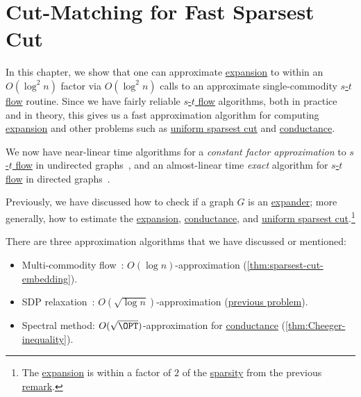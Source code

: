 \chapter{Cut-Matching for Fast Sparsest Cut}
In this chapter, we show that one can approximate \hyperref[def:expansion]{expansion} to within an \(O(\log ^2 n)\) factor via \(O(\log ^2 n)\) calls to an approximate single-commodity \hyperref[prb:s-t-max-flow]{\(s\)-\(t\) flow} routine. Since we have fairly reliable \hyperref[prb:s-t-max-flow]{\(s\)-\(t\) flow} algorithms, both in practice and in theory, this gives us a fast approximation algorithm for computing \hyperref[def:expansion]{expansion} and other problems such as \hyperref[prb:sparsest-cut]{uniform sparsest cut} and \hyperref[def:conductance]{conductance}.

\begin{note}
	We now have near-linear time algorithms for a \emph{constant factor approximation} to \hyperref[prb:s-t-max-flow]{\(s\)-\(t\) flow} in undirected graphs~\cite{peng2016approximate}, and an almost-linear time \emph{exact} algorithm for \hyperref[prb:s-t-max-flow]{\(s\)-\(t\) flow} in directed graphs~\cite{chen2022maximum}.
\end{note}

Previously, we have discussed how to check if a graph \(G\) is an \hyperref[def:expander]{expander}; more generally, how to estimate the \hyperref[def:expansion]{expansion}, \hyperref[def:conductance]{conductance}, and \hyperref[prb:sparsest-cut]{uniform sparsest cut}.\footnote{The \hyperref[def:expansion]{expansion} is within a factor of \(2\) of the \hyperref[def:sparsity]{sparsity} from the previous \hyperref[rmk:expansion-sparsity]{remark}.}

\begin{prev}
	There are three approximation algorithms that we have discussed or mentioned:
	\begin{itemize}
		\item Multi-commodity flow~\cite{leighton1999multicommodity}: \(O(\log n)\)-approximation (\autoref{thm:sparsest-cut-embedding}).
		\item SDP relaxation~\cite{arora2009expander}: \(O(\sqrt{\log n} )\)-approximation (\hyperref[prb:SDP-sparsest-cut]{previous problem}).
		\item Spectral method: \(O(\sqrt{\OPT} )\)-approximation for \hyperref[def:conductance]{conductance} (\autoref{thm:Cheeger-inequality}).
	\end{itemize}
\end{prev}

